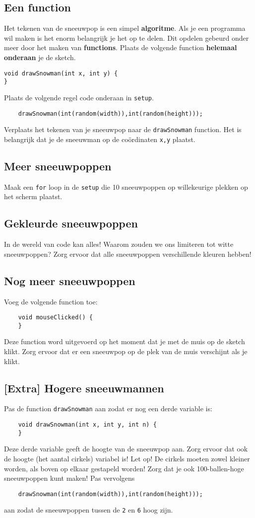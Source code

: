 \documentclass[../syllabus.tex]{subfiles}
\begin{document}
\subsection{Een function}
Het tekenen van de sneeuwpop is een simpel \textbf{algoritme}. Als je een programma wil maken is het enorm belangrijk je het op te delen. Dit opdelen gebeurd onder meer door het maken van \textbf{functions}. Plaats de volgende function \textbf{helemaal onderaan} je de sketch.
\begin{lstlisting}
void drawSnowman(int x, int y) {
}
\end{lstlisting}
Plaats de volgende regel code onderaan in \texttt{setup}.
\begin{lstlisting}
    drawSnowman(int(random(width)),int(random(height)));
\end{lstlisting}
Verplaats het tekenen van je sneeuwpop naar de \texttt{drawSnowman} function. Het is belangrijk dat je de sneeuwman op de co\"ordinaten \texttt{x,y} plaatst.

\subsection{Meer sneeuwpoppen}
Maak een \texttt{for} loop in de \texttt{setup} die 10 sneeuwpoppen op willekeurige plekken op het scherm plaatst.
\subsection{Gekleurde sneeuwpoppen}
In de wereld van code kan alles! Waarom zouden we ons limiteren tot witte sneeuwpoppen?
Zorg ervoor dat alle sneeuwpoppen verschillende kleuren hebben!
\subsection{Nog meer sneeuwpoppen}
Voeg de volgende function toe:
\begin{lstlisting}
    void mouseClicked() {
    }
\end{lstlisting}
Deze function word uitgevoerd op het moment dat je met de muis op de sketch klikt. Zorg ervoor dat er een sneeuwpop op de plek van de muis verschijnt als je klikt. 
\subsection{[Extra] Hogere sneeuwmannen}
Pas de function \texttt{drawSnowman} aan zodat er nog een derde variable is:
\begin{lstlisting}
    void drawSnowman(int x, int y, int n) {
    }
\end{lstlisting}
Deze derde variable geeft de hoogte van de sneeuwpop aan. Zorg ervoor dat ook de hoogte (het aantal cirkels) variabel is! Let op! De cirkels moeten zowel kleiner worden, als boven op elkaar gestapeld worden! Zorg dat je ook 100-ballen-hoge sneeuwpoppen kunt maken! Pas vervolgens 
\begin{lstlisting}
    drawSnowman(int(random(width)),int(random(height)));
\end{lstlisting}
aan zodat de sneeuwpoppen tussen de \texttt{2} en \texttt{6} hoog zijn.
\end{document}
